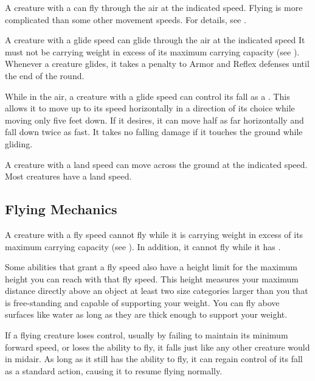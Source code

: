         \label{Flying}
        A creature with a  can fly through the air at the indicated speed.
        Flying is more complicated than some other movement speeds.
        For details, see .

        \label{Gliding}
        A creature with a glide speed can glide through the air at the indicated speed
        It must not be carrying weight in excess of its maximum carrying capacity (see ).
        Whenever a creature glides, it takes a  penalty to Armor and Reflex defenses until the end of the round.

        While in the air, a creature with a glide speed can control its fall as a . This allows it to move up to its speed horizontally in a direction of its choice while moving only five feet down. If it desires, it can move half as far horizontally and fall down twice as fast. It takes no falling damage if it touches the ground while gliding.

        A creature with a land speed can move across the ground at the indicated speed.
        Most creatures have a land speed.

    \subsection{Flying Mechanics}\label{Flying Mechanics}
        A creature with a fly speed cannot fly while it is carrying weight in excess of its maximum carrying capacity (see ).
        In addition, it cannot fly while it has .

         Some abilities that grant a fly speed also have a height limit for the maximum height you can reach with that fly speed.
        This height measures your maximum distance directly above an object at least two size categories larger than you that is free-standing and capable of supporting your weight.
        You can fly above surfaces like water as long as they are thick enough to support your weight.

         If a flying creature loses control, usually by failing to maintain its minimum forward speed, or loses the ability to fly, it falls just like any other creature would in midair. As long as it still has the ability to fly, it can regain control of its fall as a standard action, causing it to resume flying normally.

